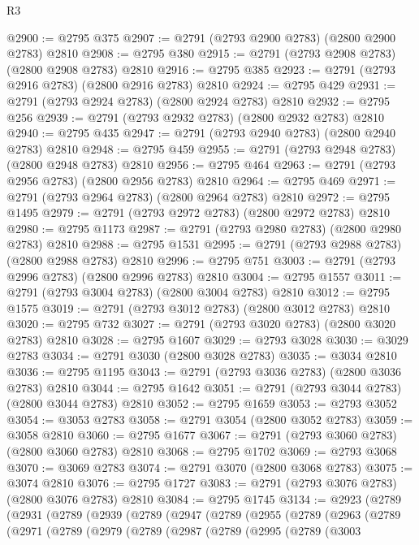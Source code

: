 \begin{lexlean}{R3}
\begin{coremodule}
@2900 := @2795 @375
@2907 := @2791 (@2793 @2900 @2783) (@2800 @2900 @2783) @2810
@2908 := @2795 @380
@2915 := @2791 (@2793 @2908 @2783) (@2800 @2908 @2783) @2810
@2916 := @2795 @385
@2923 := @2791 (@2793 @2916 @2783) (@2800 @2916 @2783) @2810
@2924 := @2795 @429
@2931 := @2791 (@2793 @2924 @2783) (@2800 @2924 @2783) @2810
@2932 := @2795 @256
@2939 := @2791 (@2793 @2932 @2783) (@2800 @2932 @2783) @2810
@2940 := @2795 @435
@2947 := @2791 (@2793 @2940 @2783) (@2800 @2940 @2783) @2810
@2948 := @2795 @459
@2955 := @2791 (@2793 @2948 @2783) (@2800 @2948 @2783) @2810
@2956 := @2795 @464
@2963 := @2791 (@2793 @2956 @2783) (@2800 @2956 @2783) @2810
@2964 := @2795 @469
@2971 := @2791 (@2793 @2964 @2783) (@2800 @2964 @2783) @2810
@2972 := @2795 @1495
@2979 := @2791 (@2793 @2972 @2783) (@2800 @2972 @2783) @2810
@2980 := @2795 @1173
@2987 := @2791 (@2793 @2980 @2783) (@2800 @2980 @2783) @2810
@2988 := @2795 @1531
@2995 := @2791 (@2793 @2988 @2783) (@2800 @2988 @2783) @2810
@2996 := @2795 @751
@3003 := @2791 (@2793 @2996 @2783) (@2800 @2996 @2783) @2810
@3004 := @2795 @1557
@3011 := @2791 (@2793 @3004 @2783) (@2800 @3004 @2783) @2810
@3012 := @2795 @1575
@3019 := @2791 (@2793 @3012 @2783) (@2800 @3012 @2783) @2810
@3020 := @2795 @732
@3027 := @2791 (@2793 @3020 @2783) (@2800 @3020 @2783) @2810
@3028 := @2795 @1607
@3029 := @2793 @3028
@3030 := @3029 @2783
@3034 := @2791 @3030 (@2800 @3028 @2783)
@3035 := @3034 @2810
@3036 := @2795 @1195
@3043 := @2791 (@2793 @3036 @2783) (@2800 @3036 @2783) @2810
@3044 := @2795 @1642
@3051 := @2791 (@2793 @3044 @2783) (@2800 @3044 @2783) @2810
@3052 := @2795 @1659
@3053 := @2793 @3052
@3054 := @3053 @2783
@3058 := @2791 @3054 (@2800 @3052 @2783)
@3059 := @3058 @2810
@3060 := @2795 @1677
@3067 := @2791 (@2793 @3060 @2783) (@2800 @3060 @2783) @2810
@3068 := @2795 @1702
@3069 := @2793 @3068
@3070 := @3069 @2783
@3074 := @2791 @3070 (@2800 @3068 @2783)
@3075 := @3074 @2810
@3076 := @2795 @1727
@3083 := @2791 (@2793 @3076 @2783) (@2800 @3076 @2783) @2810
@3084 := @2795 @1745
@3134 := @2923
    (@2789
      (@2931
        (@2789
          (@2939
            (@2789
              (@2947
                (@2789
                  (@2955
                    (@2789
                      (@2963
                        (@2789
                          (@2971
                            (@2789
                              (@2979
                                (@2789
                                  (@2987
                                    (@2789
                                      (@2995
                                        (@2789
                                          (@3003

\end{coremodule}
\end{lexlean}

